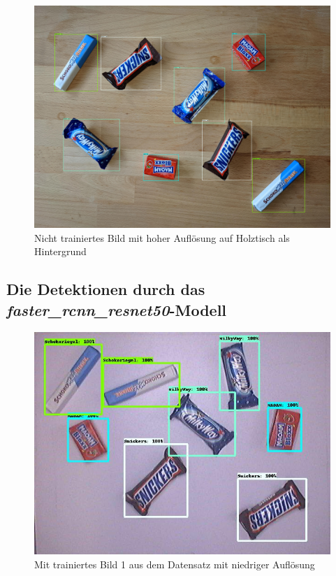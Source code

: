     \begin{figure}[H]
        \centering
        \includegraphics[angle = 90, width = \textwidth]{Bilder/models/model_comparison/faster_rcnn_inception_resnet_v2_640x640_coco17_tpu-8/HD_on_wood.jpg}
        \caption{Nicht trainiertes Bild mit hoher Auflösung auf Holztisch als Hintergrund}
    \end{figure}
    
    \subsection{Die Detektionen durch das \textit{faster\_rcnn\_resnet50}-Modell}
    
    \begin{figure}[H]
        \vspace{-5mm}
        \centering
        \includegraphics[angle = 90, height = 0.85\textheight]{Bilder/models/model_comparison/faster_rcnn_resnet50_v1_640x640_coco17_tpu-8/trained_1.jpg}
        \caption{Mit trainiertes Bild 1 aus dem Datensatz mit niedriger Auflösung}
    \end{figure}
    
